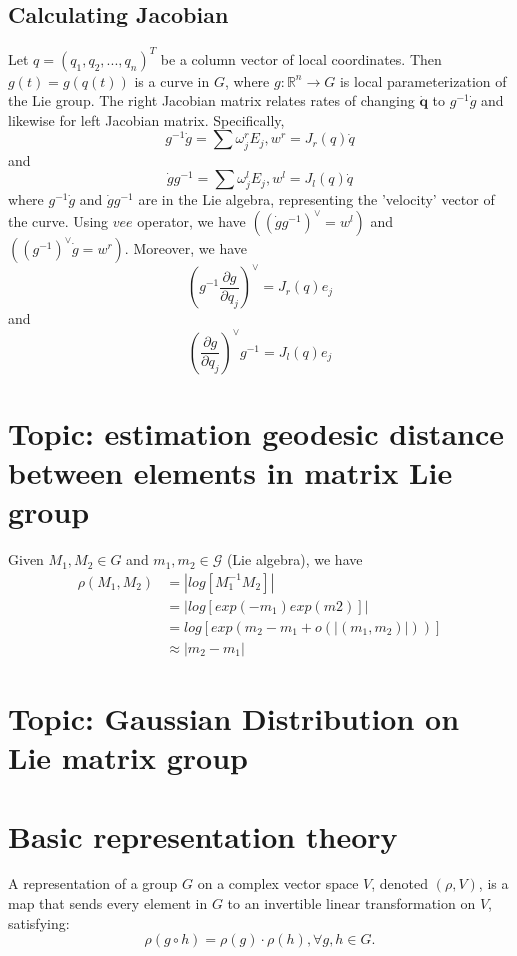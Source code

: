 \begin{refsection}
\subsection{Calculating Jacobian}
Let $q = (q_1,q_2,...,q_n)^T $ be a column vector of local coordinates. Then $g(t) = g(q(t))$ is a curve in $G$, where $g:\mathbb{R}^n \rightarrow G$ is local parameterization of the Lie group. The right Jacobian matrix relates rates of changing $\dot{\mathbf{q}}$ to $g^{-1}\dot{g}$ and likewise for left Jacobian matrix. Specifically, 
$$g^{-1}\dot{g} = \sum \omega_j^rE_j, w^r = J_r(q)\dot{q}$$
and
$$\dot{g}g^{-1} = \sum \omega_j^lE_j, w^l = J_l(q)\dot{q}$$
where $g^{-1}\dot{g}$ and $\dot{g}g^{-1}$ are in the Lie algebra, representing the 'velocity' vector of the curve. Using $vee$ operator, we have $((\dot{g}g^{-1})^{\vee} = w^l)$ and $((g^{-1})^{\vee}\dot{g} = w^r)$.
Moreover, we have
$$(g^{-1}\frac{\partial g}{\partial q_j})^{\vee} = J_r(q)e_j$$
and $$(\frac{\partial g}{\partial q_j})^{\vee} g^{-1} = J_l(q)e_j$$

\section{Topic: estimation geodesic distance between elements in matrix Lie group}
Given $M_1,M_2 \in G$ and $m_1,m_2 \in \mathcal{G}$ (Lie algebra), we have\cite{Xu2012}
\begin{align*}
 \rho(M_1,M_2) &= |log[M_1^{-1}M_2]|\\
                & = |log[exp(-m_1)exp(m2)]|\\
                & = log[exp(m_2-m_1+o(|(m_1,m_2)|))]\\
                & \approx |m_2 - m_1|
\end{align*}


\section{Topic: Gaussian Distribution on Lie matrix group}
\cite{long2012banana}\cite{Fletcher}

\section{Basic representation theory}
\begin{definition}[representation]
A representation of a group $G$ on a complex vector space $V$, denoted $(\rho, V)$, is a map that sends every element in $G$ to an invertible linear transformation on $V$, satisfying: $$\rho(g\circ h) = \rho(g)\cdot \rho(h),\forall g,h \in G.$$
\end{definition}



\end{refsection}
